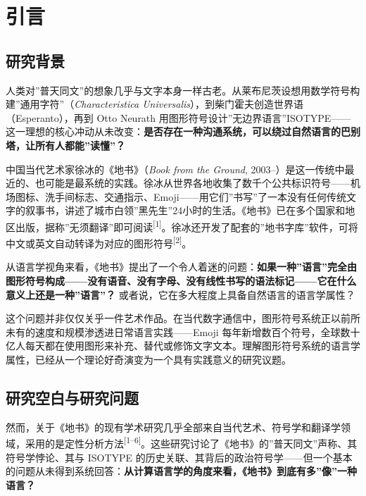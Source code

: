 \documentclass[12pt,a4paper,UTF8,fontset=founder]{ctexart}
\begin{document}

\section{引言}\label{ux5f15ux8a00}

\subsection{研究背景}\label{ux7814ux7a76ux80ccux666f}

人类对''普天同文''的想象几乎与文字本身一样古老。从莱布尼茨设想用数学符号构建''通用字符''（\emph{Characteristica Universalis}），到柴门霍夫创造世界语（Esperanto），再到 Otto Neurath 用图形符号设计''无边界语言''ISOTYPE------这一理想的核心冲动从未改变：\textbf{是否存在一种沟通系统，可以绕过自然语言的巴别塔，让所有人都能''读懂''？}

中国当代艺术家徐冰的《地书》（\emph{Book from the Ground}, 2003--）是这一传统中最近的、也可能是最系统的实践。徐冰从世界各地收集了数千个公共标识符号------机场图标、洗手间标志、交通指示、Emoji------用它们''书写''了一本没有任何传统文字的叙事书，讲述了城市白领''黑先生''24小时的生活。《地书》已在多个国家和地区出版，据称''无须翻译''即可阅读\textsuperscript{{[}1{]}}。徐冰还开发了配套的''地书字库''软件，可将中文或英文自动转译为对应的图形符号\textsuperscript{{[}2{]}}。

从语言学视角来看，《地书》提出了一个令人着迷的问题：\textbf{如果一种''语言''完全由图形符号构成------没有语音、没有字母、没有线性书写的语法标记------它在什么意义上还是一种''语言''？} 或者说，它在多大程度上具备自然语言的语言学属性？

这个问题并非仅仅关乎一件艺术作品。在当代数字通信中，图形符号系统正以前所未有的速度和规模渗透进日常语言实践------Emoji 每年新增数百个符号，全球数十亿人每天都在使用图形来补充、替代或修饰文字文本。理解图形符号系统的语言学属性，已经从一个理论好奇演变为一个具有实践意义的研究议题。

\subsection{研究空白与研究问题}\label{ux7814ux7a76ux7a7aux767dux4e0eux7814ux7a76ux95eeux9898}

然而，关于《地书》的现有学术研究几乎全部来自当代艺术、符号学和翻译学领域，采用的是定性分析方法\textsuperscript{{[}1--6{]}}。这些研究讨论了《地书》的''普天同文''声称、其符号学悖论、其与 ISOTYPE 的历史关联、其背后的政治符号学------但一个基本的问题从未得到系统回答：\textbf{从计算语言学的角度来看，《地书》到底有多''像''一种语言？}
\end{document}
